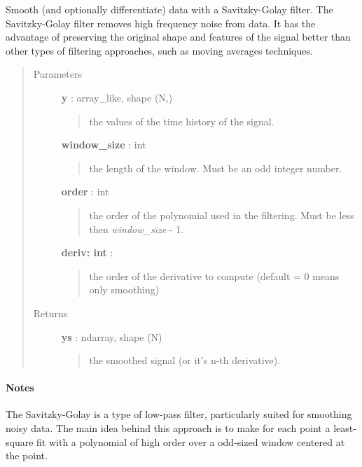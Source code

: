 \documentclass[letterpaper,10pt,english]{sphinxmanual}
\begin{document}
\begin{fulllineitems}
\label{savitzky_golay:savitzky_golay.savitzky_golay}
Smooth (and optionally differentiate) data with a Savitzky-Golay filter.
The Savitzky-Golay filter removes high frequency noise from data.
It has the advantage of preserving the original shape and
features of the signal better than other types of filtering
approaches, such as moving averages techniques.
\begin{quote}\begin{description}
\item[{Parameters}] \leavevmode
\textbf{y} : array\_like, shape (N,)
\begin{quote}

the values of the time history of the signal.
\end{quote}

\textbf{window\_size} : int
\begin{quote}

the length of the window. Must be an odd integer number.
\end{quote}

\textbf{order} : int
\begin{quote}

the order of the polynomial used in the filtering.
Must be less then \emph{window\_size} - 1.
\end{quote}

\textbf{deriv: int} :
\begin{quote}

the order of the derivative to compute (default = 0 means only smoothing)
\end{quote}

\item[{Returns}] \leavevmode
\textbf{ys} : ndarray, shape (N)
\begin{quote}

the smoothed signal (or it's n-th derivative).
\end{quote}

\end{description}\end{quote}
\paragraph{Notes}

The Savitzky-Golay is a type of low-pass filter, particularly
suited for smoothing noisy data. The main idea behind this
approach is to make for each point a least-square fit with a
polynomial of high order over a odd-sized window centered at
the point.

\end{fulllineitems}
\end{document}
